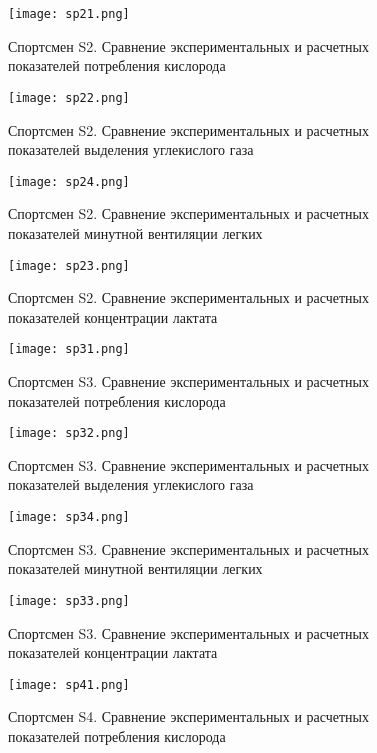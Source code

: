 \begin{figure}[!ht]
	\centering
	\texttt{[image: sp21.png]}
	\caption{Спортсмен S2. Сравнение экспериментальных и расчетных показателей потребления кислорода } 
\end{figure}

\begin{figure}[!ht]
	\centering
	\texttt{[image: sp22.png]}
	\caption{Спортсмен S2. Сравнение экспериментальных и расчетных показателей выделения углекислого газа} 
\end{figure}

\begin{figure}[!ht]
	\centering
	\texttt{[image: sp24.png]}
	\caption{Спортсмен S2. Сравнение экспериментальных и расчетных показателей минутной вентиляции легких} 
\end{figure}

\begin{figure}[!ht]
	\centering
	\texttt{[image: sp23.png]}
	\caption{Спортсмен S2. Сравнение экспериментальных и расчетных показателей концентрации лактата} 
\end{figure}

\begin{figure}[!ht]
	\centering
	\texttt{[image: sp31.png]}
	\caption{Спортсмен S3. Сравнение экспериментальных и расчетных показателей потребления кислорода } 
\end{figure}

\begin{figure}[!ht]
	\centering
	\texttt{[image: sp32.png]}
	\caption{Спортсмен S3. Сравнение экспериментальных и расчетных показателей выделения углекислого газа} 
\end{figure}

\begin{figure}[!ht]
	\centering
	\texttt{[image: sp34.png]}
	\caption{Спортсмен S3. Сравнение экспериментальных и расчетных показателей минутной вентиляции легких} 
\end{figure}

\begin{figure}[!ht]
	\centering
	\texttt{[image: sp33.png]}
	\caption{Спортсмен S3. Сравнение экспериментальных и расчетных показателей концентрации лактата} 
\end{figure}

\begin{figure}[!ht]
	\centering
	\texttt{[image: sp41.png]}
	\caption{Спортсмен S4. Сравнение экспериментальных и расчетных показателей потребления кислорода } 
\end{figure}


